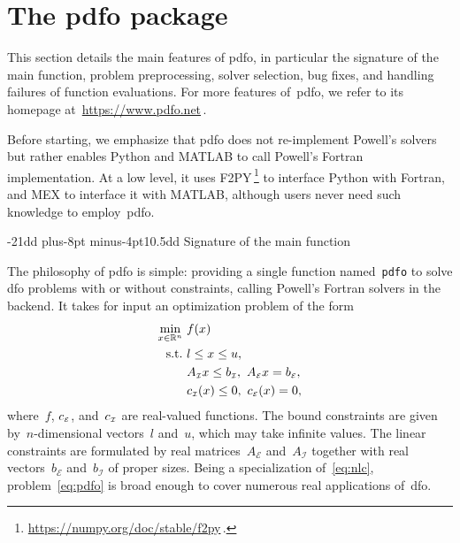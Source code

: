\documentclass[
    smallextended,  %
    final,          %
]{svjour3}
\makeatletter
\newcommand{\R}{\mathbb{R}}
\newcommand{\aeq}{A_{\scriptscriptstyle\mathcal{E}}}
\newcommand{\aub}{A_{\scriptscriptstyle\mathcal{I}}}
\newcommand{\beq}{b_{\scriptscriptstyle\mathcal{E}}}
\newcommand{\bub}{b_{\scriptscriptstyle\mathcal{I}}}
\newcommand{\ceq}{\con[\scriptscriptstyle\mathcal{E}]}
\newcommand{\con}[1][i]{c\ifthenelse{\equal{#1}{}}{}{_{#1}}}
\newcommand{\cub}{\con[\scriptscriptstyle\mathcal{I}]}
\newcommand{\obj}{f}
\newcommand{\st}{\text{s.t.}}
\newcommand{\xl}{l}
\newcommand{\xu}{u}
\newcommand{\pdfofun}{\texttt{pdfo}\xspace}
\def\subsection{\@startsection{subsection}{2}{\z@}%
    {-21dd plus-8pt minus-4pt}{10.5dd}
     {\normalsize\bfseries}}
\makeatother
\begin{document}
\section{The \gls{pdfo} package}
\label{sec:pdfo}

This section details the main features of \gls{pdfo}, in particular the signature of the main
function, problem preprocessing, solver selection, bug fixes, and handling failures of function
evaluations. For more features of~\gls{pdfo}, we refer to its homepage
at~\url{https://www.pdfo.net}\,.

Before starting, we
emphasize that \gls{pdfo} does not re-implement Powell’s solvers but rather enables Python and MATLAB
to call Powell's Fortran implementation.
At a low level, it uses F2PY\,\footnote{\url{https://numpy.org/doc/stable/f2py}\,.} to interface Python with Fortran, and MEX to
interface it with MATLAB, although users never need such knowledge to employ~\gls{pdfo}.

\subsection{Signature of the main function}

The philosophy of \gls{pdfo} is simple: providing a single function named~\pdfofun to solve
\gls{dfo} problems with or without constraints, calling Powell's Fortran solvers in the backend.
It takes for input an optimization problem of the form
\begin{subequations}
    \label{eq:pdfo}
    \begin{align}
        \min_{x \in \R^n}   & ~ \obj(x)\\
        \st                 & ~ \xl \le x \le \xu, \label{eq:pdfo-b}\\
                            & ~ \aub x \le \bub, ~ \aeq x = \beq, \label{eq:pdfo-l}\\
                            & ~ \cub(x) \le 0, ~ \ceq(x) = 0, \label{eq:pdfo-nl}
    \end{align}
\end{subequations}
where~$\obj$, $\ceq$, and~$\cub$ are real-valued functions. The bound constraints are given
by~$n$-dimensional vectors~$\xl$ and~$\xu$, which may take infinite values. The linear constraints
are formulated by real matrices~$\aeq$ and~$\aub$ together with real vectors~$\beq$ and~$\bub$ of
proper sizes. Being a specialization of~\eqref{eq:nlc}, problem~\eqref{eq:pdfo} is broad enough to
cover numerous real applications of~\gls{dfo}.
\end{document}
